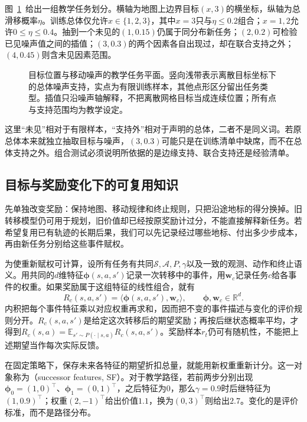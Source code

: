 图~\ref{fig:rl-transfer-task-plane}~给出一组教学任务划分。横轴为地图上边界目标$(x,3)$的横坐标，纵轴为总滑移概率$\eta$。训练总体仅允许$x\in\{1,2,3\}$，其中$x=3$只与$\eta\leq0.2$组合；$x=1,2$允许$0\leq\eta\leq0.4$。抽到一个未见的$(1,0.15)$仍属于同分布新任务；$(2,0.2)$可检验已见噪声值之间的插值；$(3,0.3)$的两个因素各自出现过，却在联合支持之外；$(4,0.45)$则含未见因素范围。

\begin{figure}[htbp]
  \centering
  
  \caption{目标位置与移动噪声的教学任务平面。竖向浅带表示离散目标坐标下的总体噪声支持，实点为有限训练样本，其他点形区分留出任务类型。插值只沿噪声轴解释，不把离散网格目标当成连续位置；所有点与支持范围均为教学设定。}
  \label{fig:rl-transfer-task-plane}
\end{figure}

这里“未见”相对于有限样本，“支持外”相对于声明的总体，二者不是同义词。若原总体本来就独立抽取目标与噪声，$(3,0.3)$可能只是在训练清单中缺席，而不在总体支持之外。组合测试必须说明所依据的是边缘支持、联合支持还是经验清单。

\subsection{目标与奖励变化下的可复用知识}
\label{sec:rl-transfer-reward-change}

先单独改变奖励：保持地图、移动规律和终止规则，只把沿途地标的得分换掉。旧转移模型仍可用于规划，旧价值却已经按原奖励计过分，不能直接解释新任务。若希望复用已有轨迹的长期后果，我们可以先记录经过哪些地标、付出多少步成本，再由新任务分别给这些事件赋权。

为使重新赋权可计算，设所有任务有共同$\mathcal S,\mathcal A,P,\gamma$以及一致的观测、动作和终止语义。用共同的$d$维特征$\bm\phi(s,a,s')$记录一次转移中的事件，用$\bm w_c$记录任务$c$给各事件的权重。如果奖励属于这组特征的线性组合，就有
\begin{equation}
  R_c(s,a,s')=\langle\bm\phi(s,a,s'),\bm w_c\rangle,
  \qquad \bm\phi,\bm w_c\in\mathbb R^d.
  \label{eq:rl-transfer-linear-reward}
\end{equation}
内积把每个事件特征乘以对应权重再求和，因而把不变的事件描述与变化的评价规则分开。$R_c(s,a,s')$是给定这次转移后的期望奖励；再按后继状态概率平均，才得到$R_c(s,a)=\mathbb E_{s'\sim P(\cdot\mid s,a)}R_c(s,a,s')$。奖励样本$r_t$仍可有随机性，不能把上述期望当作每次实际反馈。

在固定策略下，保存未来各特征的期望折扣总量，就能用新权重重新计分。这一对象称为（successor features, SF）。对于教学路径，若前两步分别出现$\bm\phi_0=(1,0)^\top$、$\bm\phi_1=(0,1)^\top$，之后特征为0，那么$\gamma=0.9$时后继特征为$(1,0.9)^\top$；权重$(2,-1)^\top$给出价值$1.1$，换为$(0,3)^\top$则给出$2.7$。变化的是评价标准，而不是路径分布。

